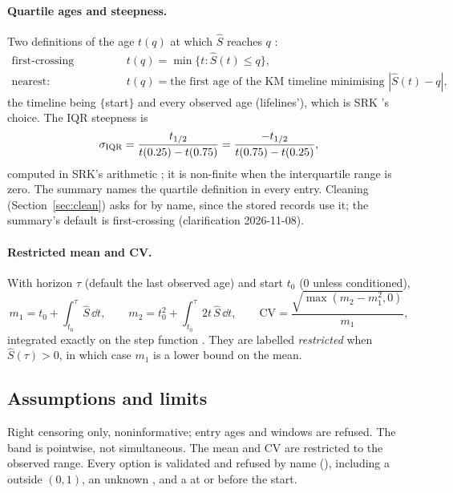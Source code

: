 \paragraph{Quartile ages and steepness.} Two definitions of the age $t(q)$ at which $\hat S$ reaches $q$
:
\begin{align}
  \text{first-crossing (default):}\quad & t(q)=\min\{t:\hat S(t)\le q\},\\
  \text{nearest:}\quad & t(q)=\text{the first age of the KM timeline minimising }|\hat S(t)-q|,
\end{align}
the timeline being $\{$start$\}$ and every observed age (lifelines'), which is SRK 's
choice. The IQR steepness is
\begin{equation}\label{eq:surv-steep}
  \sigma_{\rm IQR}=\frac{t_{1/2}}{t(0.25)-t(0.75)}=\frac{-t_{1/2}}{t(0.75)-t(0.25)},
\end{equation}
computed in SRK's arithmetic ; it is non-finite when the interquartile range is zero. The
summary names the quartile definition in every entry. Cleaning (Section~\ref{sec:clean}) asks for  by
name, since the stored records use it; the summary's default is first-crossing (clarification 2026-11-08).

\paragraph{Restricted mean and CV.} With horizon $\tau$ (default the last observed age) and start $t_0$ (0 unless
conditioned),
\begin{equation}
  m_1=t_0+\int_{t_0}^{\tau}\hat S\,\dd t,\qquad m_2=t_0^2+\int_{t_0}^{\tau}2t\,\hat S\,\dd t,\qquad
  \mathrm{CV}=\frac{\sqrt{\max(m_2-m_1^2,0)}}{m_1},
\end{equation}
integrated exactly on the step function . They are labelled \emph{restricted} when
$\hat S(\tau)>0$, in which case $m_1$ is a lower bound on the mean.

\subsection{Assumptions and limits}\label{sec:surv-limits}

Right censoring only, noninformative; entry ages and windows are refused. The band is pointwise, not simultaneous.
The mean and CV are restricted to the observed range. Every option is validated and refused by name
(), including a  outside $(0,1)$, an unknown , and a
 at or before the start.
